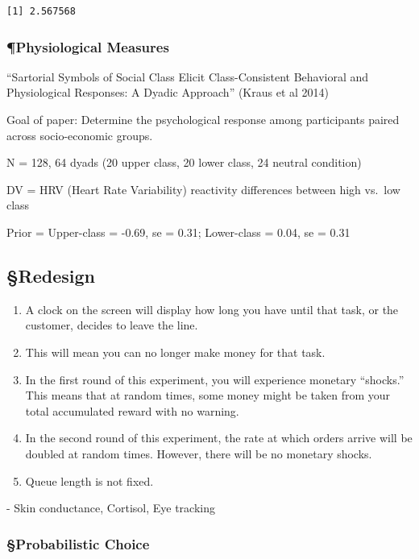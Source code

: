 \begin{verbatim}
[1] 2.567568
\end{verbatim}

\hypertarget{physiological-measures}{%
\subsubsection{¶Physiological Measures}\label{physiological-measures}}

``Sartorial Symbols of Social Class Elicit Class-Consistent Behavioral
and Physiological Responses: A Dyadic Approach'' (Kraus et al 2014)

Goal of paper: Determine the psychological response among participants
paired across socio-economic groups.

N = 128, 64 dyads (20 upper class, 20 lower class, 24 neutral condition)

DV = HRV (Heart Rate Variability) reactivity differences between high
vs.~low class

Prior = Upper-class = -0.69, se = 0.31; Lower-class = 0.04, se = 0.31

\hypertarget{redesign}{%
\subsection{§Redesign}\label{redesign}}

\begin{enumerate}
\def\labelenumi{\arabic{enumi}.}
\item
  A clock on the screen will display how long you have until that task,
  or the customer, decides to leave the line.
\item
  This will mean you can no longer make money for that task.
\item
  In the first round of this experiment, you will experience monetary
  ``shocks.'' This means that at random times, some money might be taken
  from your total accumulated reward with no warning.
\item
  In the second round of this experiment, the rate at which orders
  arrive will be doubled at random times. However, there will be no
  monetary shocks.
\item
  Queue length is not fixed.
\end{enumerate}

- Skin conductance, Cortisol, Eye tracking

\hypertarget{probabilistic-choice}{%
\subsubsection{§Probabilistic Choice}\label{probabilistic-choice}}

